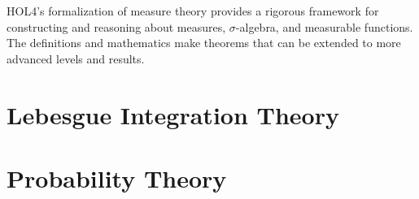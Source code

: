 HOL4's formalization of measure theory provides a rigorous framework for constructing and reasoning about measures, \(\sigma\)-algebra, and measurable functions. The definitions and mathematics make theorems that can be extended to more advanced levels and results.


\section{Lebesgue Integration Theory}

\section{Probability Theory}
